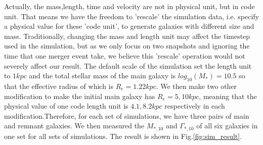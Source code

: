 \documentclass[fleqn,usenatbib]{mnras}
\begin{document}
\par Actually, the mass,length, time and velocity are not in physical unit, but in code unit. That means we have the freedom to 'rescale' the simulation data, i.e. specify a physical value for these 'code unit', to generate galaxies with different size and mass. Traditionally, changing the mass and length unit may affect the timestep used in the simulation, but as we only focus on two snapshots and ignoring the time that one merger event take, we believe this 'rescale' operation would not severely affect our result. The default scale of the simulation set the length unit to $1 kpc$ and the total stellar mass of the main galaxy is $log_{10}(M_*) = 10.5$ so that the effective radius of which is $R_e = 1.22 kpc$. We then make two other modification to make the initial main galaxy has $R_e = 5,10 kpc$, meaning that the physical value of one code length unit is $4.1, 8.2 kpc$ respectively in each modification.Therefore, for each set of simulations, we have three pairs of main and remnant galaxies. We then measured the $M_{*,10}$ and $\Gamma_{*,10}$ of all six galaxies in one set for all sets of simulations. The result is shown in Fig.\ref{fig:sim_result}. 
\end{document}
